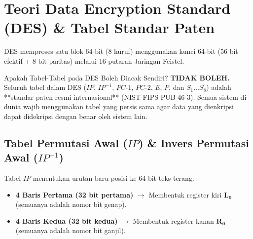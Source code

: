 \documentclass[11pt,a4paper]{article}
\begin{document}
\newpage
\section{Teori Data Encryption Standard (DES) \& Tabel Standar Paten}

DES memproses satu blok 64-bit (8 huruf) menggunakan kunci 64-bit (56 bit efektif + 8 bit paritas) melalui 16 putaran Jaringan Feistel.

\begin{infobox}{Apakah Tabel-Tabel pada DES Boleh Diacak Sendiri?}
\textbf{TIDAK BOLEH.} Seluruh tabel dalam DES ($IP$, $IP^{-1}$, $PC\text{-}1$, $PC\text{-}2$, $E$, $P$, dan $S_1 \dots S_8$) adalah **standar paten resmi internasional** (NIST FIPS PUB 46-3). Semua sistem di dunia wajib menggunakan tabel yang persis sama agar data yang dienkripsi dapat didekripsi dengan benar oleh sistem lain.
\end{infobox}

\subsection{Tabel Permutasi Awal ($IP$) \& Invers Permutasi Awal ($IP^{-1}$)}
Tabel $IP$ menentukan urutan baru posisi ke-64 bit teks terang. 
\begin{itemize}[leftmargin=*]
    \item \textbf{4 Baris Pertama (32 bit pertama)} $\to$ Membentuk register kiri $\mathbf{L_0}$ (semuanya adalah nomor bit genap).
    \item \textbf{4 Baris Kedua (32 bit kedua)} $\to$ Membentuk register kanan $\mathbf{R_0}$ (semuanya adalah nomor bit ganjil).
\end{itemize}
\end{document}

